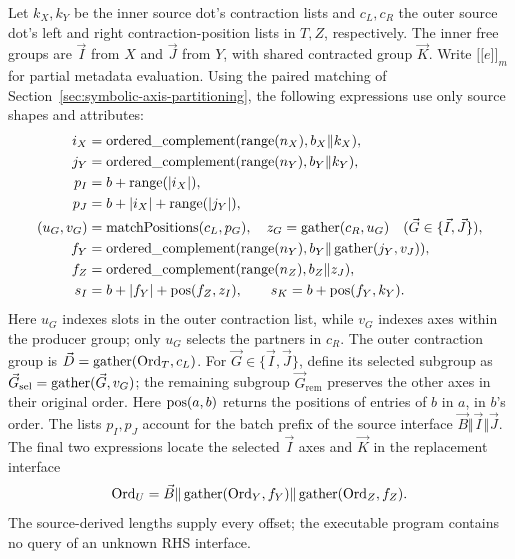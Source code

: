 Let $k_X,k_Y$ be the inner source dot's contraction lists and
$c_L,c_R$ the outer source dot's left and right contraction-position lists
in $T,Z$, respectively. The inner free groups
are $\vec I$ from $X$ and $\vec J$ from $Y$, with shared contracted group
$\vec K$. Write $\lbrack\!\lbrack e\rbrack\!\rbrack_m$ for partial metadata
evaluation. Using the paired matching of
Section~\ref{sec:symbolic-axis-partitioning}, the following expressions
use only source shapes and attributes:
\begin{equation}
\begin{aligned}
 i_X&=\operatorname{ordered\_complement}(\operatorname{range}(n_X),b_X\Vert k_X),\\
 j_Y&=\operatorname{ordered\_complement}(\operatorname{range}(n_Y),b_Y\Vert k_Y),\\
 p_I&=b+\operatorname{range}(|i_X|),\\
 p_J&=b+|i_X|+\operatorname{range}(|j_Y|),\\
 (u_G,v_G)&=\operatorname{matchPositions}(c_L,p_G),\quad z_G=\operatorname{gather}(c_R,u_G)
                 \quad(\vec G\in\{\vec I,\vec J\}),\\
 f_Y&=\operatorname{ordered\_complement}(\operatorname{range}(n_Y),
                      b_Y\Vert\operatorname{gather}(j_Y,v_J)),\\
 f_Z&=\operatorname{ordered\_complement}(\operatorname{range}(n_Z),b_Z\Vert z_J),\\
 s_I&=b+|f_Y|+\operatorname{pos}(f_Z,z_I),\qquad
 s_K=b+\operatorname{pos}(f_Y,k_Y).
\end{aligned}
\label{eq:batched-program-locals}
\end{equation}
Here $u_G$ indexes slots in the outer contraction list, while $v_G$
indexes axes within the producer group; only $u_G$ selects the partners
in $c_R$. The outer contraction group is
$\vec D=\operatorname{gather}(\operatorname{Ord}_T,c_L)$.
For $\vec G\in\{\vec I,\vec J\}$, define its selected subgroup as
$\vec G_{\mathrm{sel}}=\operatorname{gather}(\vec G,v_G)$; the remaining subgroup
$\vec G_{\mathrm{rem}}$ preserves the other axes in their original order.
Here $\operatorname{pos}(a,b)$ returns the positions of entries of $b$ in $a$, in
$b$'s order. The lists $p_I,p_J$ account for the batch prefix of the source interface
$\vec B\Vert \vec I\Vert \vec J$. The final two expressions locate the selected $\vec I$
axes and $\vec K$ in the replacement interface
\begin{equation}
 \operatorname{Ord}_U=\vec B\Vert\operatorname{gather}(\operatorname{Ord}_Y,f_Y)
                  \Vert\operatorname{gather}(\operatorname{Ord}_Z,f_Z).
 \label{eq:batched-u-interface}
\end{equation}
The source-derived lengths supply every offset; the executable program
contains no query of an unknown RHS interface.


